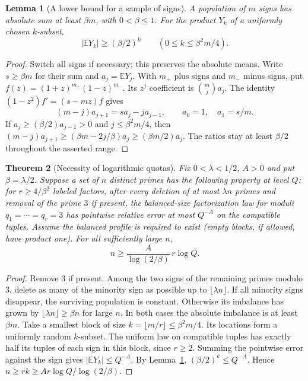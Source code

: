\documentclass[11pt]{article}
\newtheorem{theorem}{Theorem}[section]
\newtheorem{lemma}[theorem]{Lemma}
\newcommand{\E}{\mathbb E}
\begin{document}
\begin{lemma}[A lower bound for a sample of signs]\label{lem:sign}
A population of $m$ signs has absolute sum at least $\beta m$, with $0<\beta\le1$. For the product $Y_k$ of a uniformly chosen $k$-subset,
\[
 |\E Y_k|\ge(\beta/2)^k\qquad (0\le k\le\beta^2m/4).
\]
\end{lemma}
\begin{proof}
Switch all signs if necessary; this preserves the absolute means. Write $s\ge\beta m$ for their sum and $a_j=\E Y_j$. With $m_+$ plus signs and $m_-$ minus signs, put $f(z)=(1+z)^{m_+}(1-z)^{m_-}$. Its $z^j$ coefficient is $\binom mj a_j$. The identity $(1-z^2)f'=(s-mz)f$ gives
\[
  (m-j)a_{j+1}=s a_j-j a_{j-1},\qquad a_0=1,\quad a_1=s/m .
\]
If $a_j\ge(\beta/2)a_{j-1}>0$ and $j\le\beta^2m/4$, then
$(m-j)a_{j+1}\ge(\beta m-2j/\beta)a_j\ge(\beta m/2)a_j$.
The ratios stay at least $\beta/2$ throughout the asserted range.
\end{proof}

\begin{theorem}[Necessity of logarithmic quotas]\label{thm:lower}
Fix $0<\lambda<1/2$, $A>0$ and put $\beta=\lambda/2$. Suppose a set of $n$ distinct primes has the following property at level $Q$: for $r\ge 4/\beta^2$ labeled factors, after every deletion of at most $\lambda n$ primes and removal of the prime $3$ if present, the balanced-size factorization law for moduli $q_1=\cdots=q_r=3$ has pointwise relative error at most $Q^{-A}$ on the compatible tuples. Assume the balanced profile is required to exist (empty blocks, if allowed, have product one). For all sufficiently large $n$,
\[
 n\ge \frac{A}{\log(2/\beta)}\,r\log Q .
\]
\end{theorem}
\begin{proof}
Remove $3$ if present. Among the two signs of the remaining primes modulo $3$, delete as many of the minority sign as possible up to $\lfloor\lambda n\rfloor$. If all minority signs disappear, the surviving population is constant. Otherwise its imbalance has grown by $\lfloor\lambda n\rfloor\ge\beta n$ for large $n$. In both cases the absolute imbalance is at least $\beta m$. Take a smallest block of size $k=\lfloor m/r\rfloor\le\beta^2m/4$. Its locations form a uniformly random $k$-subset. The uniform law on compatible tuples has exactly half its tuples of each sign in this block, since $r\ge2$. Summing the pointwise error against the sign gives $|\E Y_k|\le Q^{-A}$. By Lemma~\ref{lem:sign}, $(\beta/2)^k\le Q^{-A}$. Hence $n\ge rk\ge Ar\log Q/\log(2/\beta)$.
\end{proof}
\end{document}
